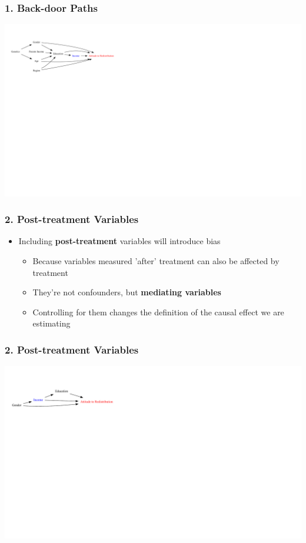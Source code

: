 \documentclass[xcolor=x11names,compress]{beamer}\usepackage[]{graphicx}\usepackage[]{color}
\newenvironment{knitrout}{}{} %
\renewcommand{\(}{\begin{columns}}
\renewcommand{\)}{\end{columns}}
\newcommand{\<}[1]{\begin{column}{#1}}
\renewcommand{\>}{\end{column}}
\begin{document}
\begin{frame}
\frametitle{1. Back-door Paths}
\begin{knitrout}
\color{fgcolor}
\includegraphics[width=2.7\linewidth]{figure/Dag4_paths_c-1} 

\end{knitrout}
\end{frame}

\begin{frame}
\frametitle{2. Post-treatment Variables}
\begin{itemize}
\item Including \textbf{post-treatment} variables will introduce bias
\pause
\begin{itemize}
\item Because variables measured 'after' treatment can also be affected by treatment
\pause
\item They're not confounders, but \textbf{mediating variables}
\pause
\item Controlling for them changes the definition of the causal effect we are estimating
\end{itemize}
\end{itemize}
\end{frame}

\begin{frame}
\frametitle{2. Post-treatment Variables}
\begin{knitrout}
\color{fgcolor}
\includegraphics[width=2.7\linewidth]{figure/Dag4-1} 

\end{knitrout}
\end{frame}
\end{document}
